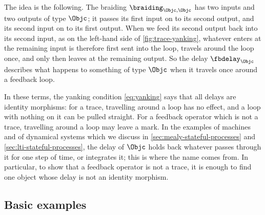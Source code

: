 The idea is the following.
The braiding $\braiding_{\Objc,\Objc}$ has two inputs and two outputs of type $\Objc$; it passes its first input on to its second output, and its second input on to its first output.
When we feed its second output back into its second input, as on the left-hand side of \cref{fig:trace-yanking}, whatever enters at the remaining input is therefore first sent into the loop, travels around the loop once, and only then leaves at the remaining output.
So the delay $\fbdelay_{\Objc}$ describes what happens to something of type $\Objc$ when it travels once around a feedback loop.

In these terms, the yanking condition \cref{eq:yanking} says that all delays are identity morphisms: for a trace, travelling around a loop has no effect, and a loop with nothing on it can be pulled straight.
For a feedback operator which is not a trace, travelling around a loop may leave a mark.
In the examples of machines and of dynamical systems which we discuss in \cref{sec:mealy-stateful-processes} and \cref{sec:lti-stateful-processes}, the delay of $\Objc$ holds back whatever passes through it for one step of time, or integrates it; this is where the name comes from.
In particular, to show that a feedback operator is not a trace, it is enough to find one object whose delay is not an identity morphism.


\subsection{Basic examples}



